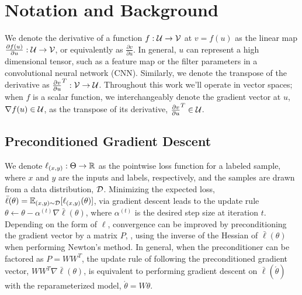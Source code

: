 \section{Notation and Background}
We denote the derivative of a function $f: {\mathcal{U}} \to {\mathcal{V}}$
at $v = f(u)$ as the linear map $\frac{\partial f(u)}{\partial u}: {\mathcal{U}} \to {\mathcal{V}}$,
or equivalently as $\frac{\partial v}{\partial u}$.
In general, $u$ can represent a high dimensional tensor,
such as a feature map or the filter parameters in a convolutional neural network (CNN).
Similarly, we denote the transpose of the derivative as
$\frac{\partial v}{\partial u}^T: {\mathcal{V}} \to {\mathcal{U}}$.
Throughout this work we'll operate in vector spaces;
when $f$ is a scalar function, we interchangeably denote
the gradient vector at $u$, $\nabla f(u) \in {\mathcal{U}}$, as the transpose of its derivative,
$\frac{\partial v}{\partial u}^T  \in {\mathcal{U}}$.

\subsection{Preconditioned Gradient Descent}
\label{sec:pcgd}
We denote $\ell_{(x,y)}: \Theta \to {\mathbb{R}}$ as the pointwise loss function for a labeled sample,
where $x$ and $y$ are the inputs and labels, respectively, and the 
samples are drawn from a data distribution, ${\mathcal{D}}$.
Minimizing the expected loss, 
$\bar{\ell}(\theta) = \mathbb{E}_{(x,y) \sim {\mathcal{D}}} [\ell_{(x,y)}(\theta)]$,
via gradient descent leads to the update rule
$\theta \leftarrow \theta - \alpha^{(t)} \nabla \bar{\ell}(\theta)$,
where $\alpha^{(t)}$ is the desired step size at iteration $t$.
Depending on the form of $\ell$, convergence can be improved by preconditioning
the gradient vector by a matrix $P$, \eg, using the inverse of the Hessian of $\bar\ell(\theta)$ when performing
Newton's method.
In general, when the preconditioner can be factored as $P=WW^T$, the update rule
of following the preconditioned gradient vector, $WW^T \nabla \bar{\ell}(\theta)$, is equivalent to
performing gradient descent on $\bar\ell(\acute\theta)$ with the reparameterized model, $\acute\theta = W\theta$.

%

